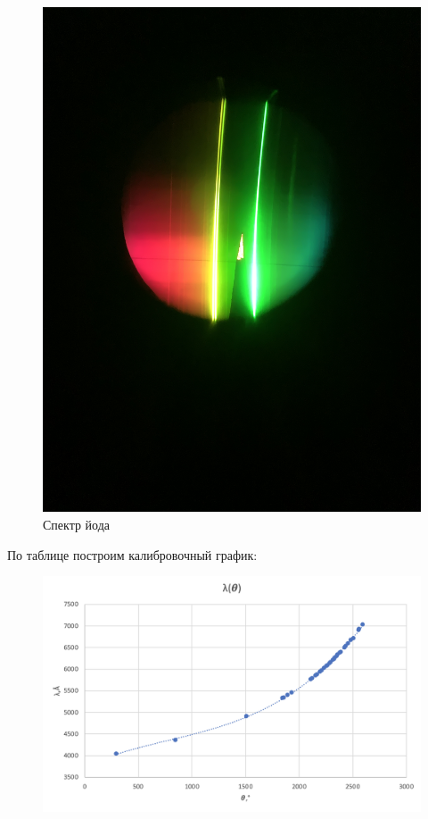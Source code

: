 \documentclass[a4paper, 12pt]{article}%
\begin{document}
\begin{enumerate}
	\begin{figure}[h!]
		\centering
		\includegraphics[angle=-90,  scale=0.075]{Спектр_йода.PNG}
		\caption{Спектр йода}
	\end{figure}

\newpage
	
	По таблице построим калибровочный график:

	\begin{figure}[h!]
		\centering
		\includegraphics[scale=0.8]{График_1.PNG}
	\end{figure}


\end{enumerate}
\end{document}

